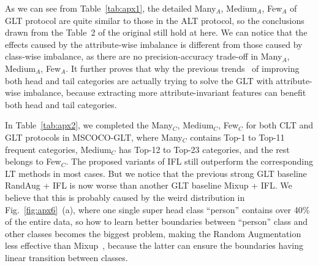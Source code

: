 \documentclass{article}
\begin{document}
As we can see from Table~\ref{tab:apx1}, the detailed Many$_A$, Medium$_A$, Few$_A$ of GLT protocol are quite similar to those in the ALT protocol, so the conclusions drawn from the Table~2 of the original still hold at here. We can notice that the effects caused by the attribute-wise imbalance is different from those caused by class-wise imbalance, as there are no precision-accuracy trade-off in Many$_A$, Medium$_A$, Few$_A$. It further proves that why the previous trends~\cite{zhang2021test} of improving both head and tail categories are actually trying to solve the GLT with attribute-wise imbalance, because extracting more attribute-invariant features can benefit both head and tail categories. 

In Table~\ref{tab:apx2}, we completed the Many$_C$, Medium$_C$, Few$_C$ for both CLT and GLT protocols in MSCOCO-GLT, where Many$_C$ contains Top-1 to Top-11 frequent categories, Medium$_C$ has Top-12 to Top-23 categories, and the rest belongs to Few$_C$. The proposed variants of IFL still outperform the corresponding LT methods in most cases. But we notice that the previous strong GLT baseline RandAug + IFL is now worse than another GLT baseline Mixup + IFL. We believe that this is probably caused by the weird distribution in Fig.~\ref{fig:apx6}~(a), where one single super head class ``person'' contains over 40\% of the entire data, so how to learn better boundaries between ``person'' class and other classes becomes the biggest problem, making the Random Augmentation~\cite{cubuk2020randaugment} less effective than Mixup~\cite{zhang2018mixup}, because the latter can ensure the boundaries having linear transition between classes.

 





\end{document}
